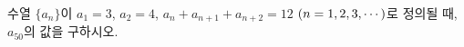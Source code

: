 수열 $\{a_n\}$이 $a_1=3$, $a_2=4$, $a_n+a_{n+1}+a_{n+2}=12$ $(n=1{,}\mkern3mu\mathopen{}2{,}\mkern3mu\mathopen{}3{,}\mkern3mu\mathopen{}\cdots)$로 정의될 때, $a_{50}$의 값을 구하시오.
